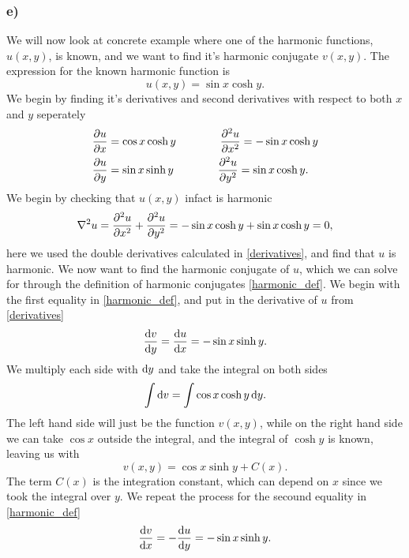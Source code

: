 \documentclass[12pt,twoside]{article}
\begin{document}
\subsubsection*{e)}
We will now look at concrete example where one of the harmonic functions, $u(x, y)$, is known, and we want to find it's harmonic conjugate $v(x,y)$. The expression for the known harmonic function is
\begin{equation}
  u(x,y) = \sin{x}\cosh{y}.
\end{equation}
We begin by finding it's derivatives and second derivatives with respect to both $x$ and $y$ seperately
\begin{align}
  \begin{split}
  \pdv{u}{x} &= \cos{x}\cosh{y}\qquad \qquad\pdv[2]{u}{x} = -\sin{x}\cosh{y} \\
  \pdv{u}{y} &= \sin{x}\sinh{y}\qquad \qquad\pdv[2]{u}{y} = \sin{x}\cosh{y}. \label{derivatives}
\end{split}
\end{align}
We begin by checking that $u(x, y)$ infact is harmonic
\begin{equation}
  \nabla^2u = \pdv[2]{u}{x}+\pdv[2]{u}{y} = -\sin{x}\cosh{y} + \sin{x}\cosh{y} = 0,
\end{equation}
here we used the double derivatives calculated in \eqref{derivatives}, and find that $u$ is harmonic. We now want to find the harmonic conjugate of $u$, which we can solve for through the definition of harmonic conjugates \eqref{harmonic_def}. We begin with the first equality in \eqref{harmonic_def}, and put in the derivative of $u$ from \eqref{derivatives}
\begin{equation}
  \dv{v}{y} = \dv{u}{x} = - \sin{x}\sinh{y}.
\end{equation}
We multiply each side with $\dif y$ and take the integral on both sides
\begin{equation}
  \int \dif v =  \int \cos{x}\cosh{y} \dif y.
\end{equation}
The left hand side will just be the function $v(x, y)$, while on the right hand side we can take $\cos{x}$ outside the integral, and the integral of $\cosh{y}$ is known, leaving us with
\begin{equation}
  v(x, y) =  \cos{x}\sinh{y} + C(x). \label{first}
\end{equation}
The term $C(x)$ is the integration constant, which can depend on $x$ since we took the integral over $y$. We repeat the process for the secound equality in \eqref{harmonic_def}
\begin{equation}
  \dv{v}{x} = -\dv{u}{y} = - \sin{x}\sinh{y}.
\end{equation}
\end{document}
